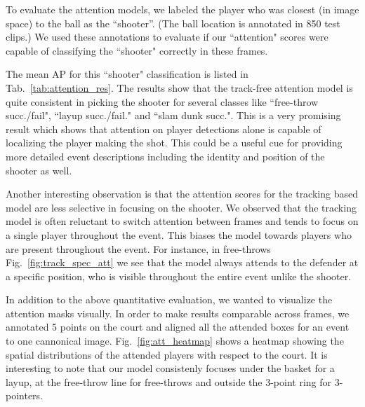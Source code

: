 To evaluate the attention models, we  labeled the player who was
closest (in image space) to the ball as the ``shooter''.
(The ball location is annotated in 850 test clips.)
We used these annotations to evaluate if our ``attention" scores
were capable of classifying the ``shooter" correctly in these frames.

The mean AP for this ``shooter"  classification is listed
in Tab.~\ref{tab:attention_res}.
The results show that the track-free attention model is quite consistent in picking
the shooter for several classes like ``free-throw succ./fail",
``layup succ./fail." and ``slam dunk succ.". This is a very
promising result which shows that attention on player detections
alone is capable of localizing the player making the shot. This could be
a useful cue for providing more detailed event descriptions
including the identity and position of the shooter as well.

Another interesting observation
is that the
attention scores for the tracking based model are less selective in focusing on
the shooter.  We observed that the tracking model is often reluctant to switch
attention between frames and tends to focus on a single player throughout the
event. This biases the model towards players who are present throughout the
event. For instance, in free-throws Fig.~\ref{fig:track_spec_att} we see that
the model always attends to the defender at a specific position, who is visible
throughout the entire event unlike the shooter.

In addition to the above quantitative evaluation, we wanted to
visualize the attention masks visually.
In order to make results comparable across frames, 
we annotated 5 points on the court and
aligned all the attended boxes for an event to one cannonical image. 
Fig.~\ref{fig:att_heatmap} shows a heatmap  showing the spatial distributions
of the attended players with respect to the court. It is interesting to note that
our model consistenly focuses under the basket for a layup, at the free-throw
line for free-throws and outside the 3-point ring for 3-pointers.



